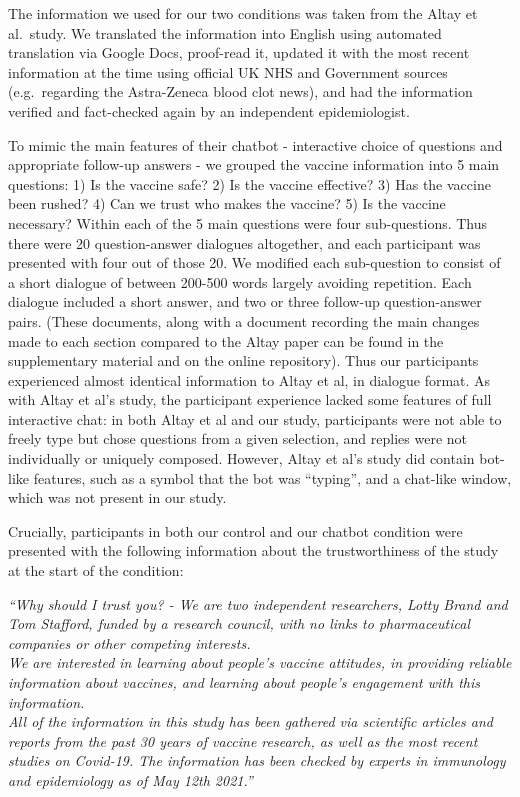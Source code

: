 \documentclass[
  english,
  ,jou,floatsintext]{apa6}
\begin{document}
The information we used for our two conditions was taken from the Altay et al.~study. We translated the information into English using automated translation via Google Docs, proof-read it, updated it with the most recent information at the time using official UK NHS and Government sources (e.g.~regarding the Astra-Zeneca blood clot news), and had the information verified and fact-checked again by an independent epidemiologist.

To mimic the main features of their chatbot - interactive choice of questions and appropriate follow-up answers - we grouped the vaccine information into 5 main questions: 1) Is the vaccine safe? 2) Is the vaccine effective? 3) Has the vaccine been rushed? 4) Can we trust who makes the vaccine? 5) Is the vaccine necessary? Within each of the 5 main questions were four sub-questions. Thus there were 20 question-answer dialogues altogether, and each participant was presented with four out of those 20. We modified each sub-question to consist of a short dialogue of between 200-500 words largely avoiding repetition. Each dialogue included a short answer, and two or three follow-up question-answer pairs. (These documents, along with a document recording the main changes made to each section compared to the Altay paper can be found in the supplementary material and on the online repository). Thus our participants experienced almost identical information to Altay et al, in dialogue format. As with Altay et al's study, the participant experience lacked some features of full interactive chat: in both Altay et al and our study, participants were not able to freely type but chose questions from a given selection, and replies were not individually or uniquely composed. However, Altay et al's study did contain bot-like features, such as a symbol that the bot was ``typing'', and a chat-like window, which was not present in our study.

Crucially, participants in both our control and our chatbot condition were presented with the following information about the trustworthiness of the study at the start of the condition:

\emph{``Why should I trust you? - We are two independent researchers, Lotty Brand and Tom Stafford, funded by a research council, with no links to pharmaceutical companies or other competing interests. }\\
\emph{We are interested in learning about people's vaccine attitudes, in providing reliable information about vaccines, and learning about people's engagement with this information. }\\
\emph{All of the information in this study has been gathered via scientific articles and reports from the past 30 years of vaccine research, as well as the most recent studies on Covid-19. The information has been checked by experts in immunology and epidemiology as of May 12th 2021.''}
\end{document}
